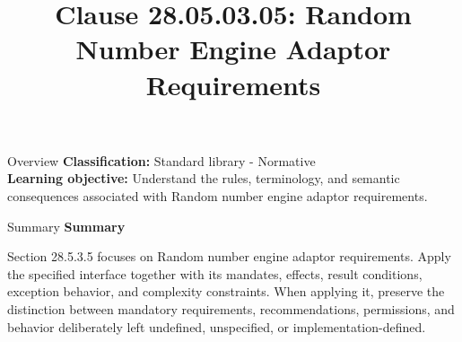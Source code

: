 \documentclass[10pt,letterpaper]{article}
\title{Clause 28.05.03.05: Random Number Engine Adaptor Requirements}
\author{}
\date{}
\begin{document}
\maketitle
\begin{CornellOverviewBox}{Overview}
\textbf{Classification:} Standard library - Normative\\[2pt]
\textbf{Learning objective:} Understand the rules, terminology, and semantic consequences associated with Random number engine adaptor requirements.
\end{CornellOverviewBox}\begin{CornellSummaryBox}{Summary}
{\sffamily\bfseries\color{Accent} Summary}\par\vspace{3pt}Section 28.5.3.5 focuses on Random number engine adaptor requirements. Apply the specified interface together with its mandates, effects, result conditions, exception behavior, and complexity constraints. When applying it, preserve the distinction between mandatory requirements, recommendations, permissions, and behavior deliberately left undefined, unspecified, or implementation-defined.
\end{CornellSummaryBox}
\end{document}
